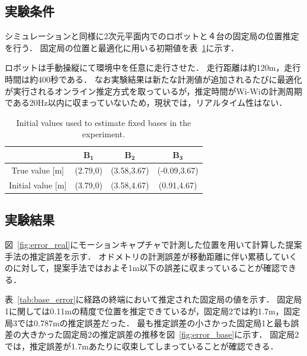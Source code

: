 \documentclass[a4jsme]{jsmepaper}
\newcommand\figref[1]{図~\ref{fig:#1}}
\newcommand\tabref[1]{表~\ref{tab:#1}}
\begin{document}
\subsection{実験条件}
シミュレーションと同様に2次元平面内でのロボットと４台の固定局の位置推定を行う．
固定局の位置と最適化に用いる初期値を\tabref{initial_real}に示す．

ロボットは手動操縦にて環境中を任意に走行させた．
走行距離は約120m，走行時間は約400秒である．
なお実験結果は新たな計測値が追加されるたびに最適化が実行されるオンライン推定方式を取っているが，推定時間がWi-Wiの計測周期である20Hz以内に収まっていないため，現状では，リアルタイム性はない．
\begin{table}
    \centering
    \caption{Initial values used to estimate fixed bases in the experiment.}
    \begin{tabular}{|c|c|c|c|}
    \hline    
        & $\mathbf{B_1}$ & $\mathbf{B_2}$ & $\mathbf{B_3}$ \\
    \hline    
       True value [m]  &(2.79,0)  &(3.58,3.67) &(-0.09,3.67) \\
       Initial value [m] &(3.79,0)  &(3.58,4.67) &(0.91,4.67) \\
    \hline
    \end{tabular}
    \label{tab:initial_real}
\end{table}
\subsection{実験結果}
\figref{error_real}にモーションキャプチャで計測した位置を用いて計算した提案手法の推定誤差を示す．
オドメトリの計測誤差が移動距離に伴い累積していくのに対して，提案手法ではおよそ1m以下の誤差に収まっていることが確認できる．

\tabref{base_error}に経路の終端において推定された固定局の値を示す．
固定局1に関しては0.11mの精度で位置を推定できているが，固定局2では約1.7m，固定局3では0.787mの推定誤差だった．
最も推定誤差の小さかった固定局1と最も誤差の大きかった固定局2の推定誤差の推移を\figref{error_base}に示す．
固定局2では，推定誤差が1.7mあたりに収束してしまっていることが確認できる．

    
\end{document}
